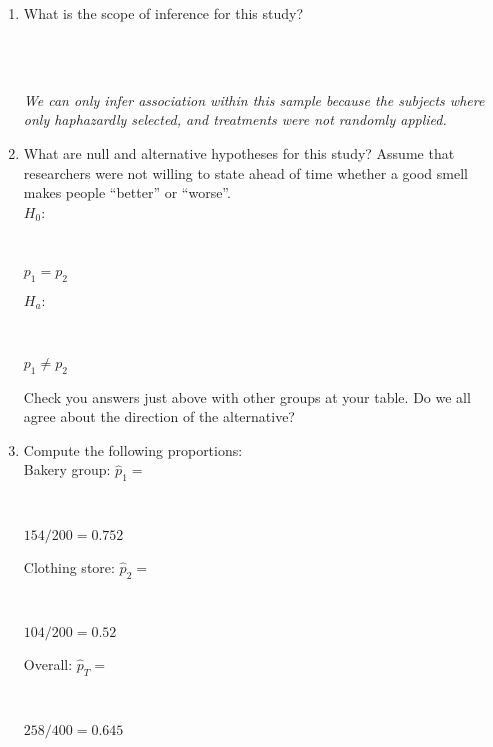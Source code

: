 \begin{enumerate}
\begin{key}
\end{key}
   \item  What is the scope of inference for this study? 
\begin{students}
 \vspace{1cm}\\
\end{students}
\begin{key}
 \\ {\it  We can only infer association within this sample because the
   subjects where only haphazardly selected, and treatments were not
   randomly applied.}
\end{key}

\item \label{Bake-hypotheses}What are null and alternative hypotheses
  for this study? Assume that researchers were not willing to state
  ahead of time whether a good smell makes people ``better'' or ``worse''. \\
  $H_0:$\
\begin{students}
 \vspace{1cm}\\
\end{students}
\begin{key}
 $p_1 = p_2$ \\
\end{key}
   $H_a: $
\begin{students}
     \vspace{1cm}\\
\end{students}
\begin{key}
   $ p_1 \neq p_2$ \\
\end{key}   

     Check you  answers just above with other groups at your table.
     Do we all agree about the direction of the alternative?  
\item Compute the following proportions:\\
    Bakery group:  $\widehat{p}_1 = $
\begin{students}
 \vspace{1cm}\\
\end{students}
\begin{key}
  $154/200 = 0.752$ \\
\end{key}
Clothing store: $\widehat{p}_2 = $
\begin{students}
 \vspace{1cm}\\
\end{students}
\begin{key}
  $104/200 = 0.52$ \\
\end{key}
    Overall: $\widehat{p}_T = $
\begin{students}
 \vspace{1cm}\\
\end{students}
\begin{key}
  $258/400 = 0.645$ \\
\end{key}


\end{enumerate}
